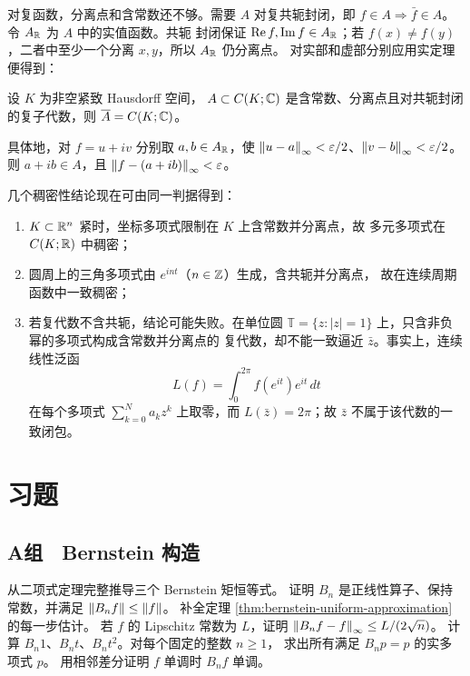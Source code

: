 对复函数，分离点和含常数还不够。需要 $A$ 对复共轭封闭，即
$f\in A\Rightarrow\bar f\in A$。令 $A_{\mathbb{R}}$ 为 $A$ 中的实值函数。共轭
封闭保证 $\operatorname{Re}f,\operatorname{Im}f\in A_{\mathbb{R}}$；若
$f(x)\ne f(y)$，二者中至少一个分离 $x,y$，所以 $A_{\mathbb{R}}$ 仍分离点。
对实部和虚部分别应用实定理便得到：

\begin{corollary}
\label{cor:complex-stone-weierstrass}
设 $K$ 为非空紧致 Hausdorff 空间，
$A\subset C(K;\mathbb{C})$ 是含常数、分离点且对共轭封闭的复子代数，则
$\overline A=C(K;\mathbb{C})$。
\end{corollary}

具体地，对 $f=u+iv$ 分别取 $a,b\in A_{\mathbb{R}}$，使
$\left\lVert u-a\right\rVert_\infty<\varepsilon/2$、$\left\lVert v-b\right\rVert_\infty<\varepsilon/2$。
则 $a+ib\in A$，且 $\left\lVert f-(a+ib)\right\rVert_\infty<\varepsilon$。

几个稠密性结论现在可由同一判据得到：
\begin{enumerate}
 \item $K\subset\mathbb{R}^n$ 紧时，坐标多项式限制在 $K$ 上含常数并分离点，故
 多元多项式在 $C(K;\mathbb{R})$ 中稠密；
 \item 圆周上的三角多项式由 $e^{int}$（$n\in\mathbb{Z}$）生成，含共轭并分离点，
 故在连续周期函数中一致稠密；
 \item 若复代数不含共轭，结论可能失败。在单位圆
 $\mathbb T=\{z:|z|=1\}$ 上，只含非负幂的多项式构成含常数并分离点的
 复代数，却不能一致逼近 $\bar z$。事实上，连续线性泛函
 \[
  L(f)=\int_0^{2\pi}f(e^{it})e^{it}\,dt
 \]
 在每个多项式 $\sum_{k=0}^Na_kz^k$ 上取零，而 $L(\bar z)=2\pi$；故
 $\bar z$ 不属于该代数的一致闭包。
\end{enumerate}

\section*{习题}

\subsection*{A组　Bernstein 构造}
\begin{enumerate}[label=\textbf{\thechapter.\arabic*.}]
 从二项式定理完整推导三个 Bernstein 矩恒等式。
 证明 $B_n$ 是正线性算子、保持常数，并满足
 $\left\lVert B_nf\right\rVert\le\left\lVert f\right\rVert$。
 补全定理 \ref{thm:bernstein-uniform-approximation} 的每一步估计。
 若 $f$ 的 Lipschitz 常数为 $L$，证明
 $\left\lVert B_nf-f\right\rVert_\infty\le L/(2\sqrt n)$。
 计算 $B_n1$、$B_nt$、$B_nt^2$。对每个固定的整数 $n\ge1$，
 求出所有满足 $B_np=p$ 的实多项式 $p$。
 用相邻差分证明 $f$ 单调时 $B_nf$ 单调。
\end{enumerate}

